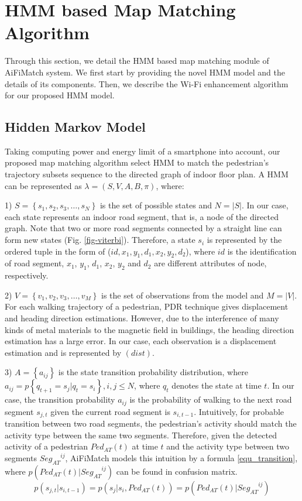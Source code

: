 \documentclass{llncs}
\begin{document}
\section{HMM based Map Matching Algorithm}

Through this section, we detail the HMM based map matching module of AiFiMatch system. We first start by providing the novel HMM model and the details of its components. Then, we describe the Wi-Fi enhancement algorithm for our proposed HMM model.

\subsection{Hidden Markov Model}

Taking computing power and energy limit of a smartphone into account, our proposed map matching algorithm select HMM to match the pedestrian's trajectory subsets sequence to the directed graph of indoor floor plan. A HMM can be represented as $\lambda  = (S,V,A,B,\pi)$, where:

1) $S = \left\{ {{s_1},{s_2},{s_3}, \ldots ,{s_N}} \right\}$ is the set of possible states and $N = \left| S \right|$. In our case, each state represents an indoor road segment, that is, a node of the directed graph. Note that two or more road segments connected by a straight line can form new states (Fig. \ref{fig-viterbi}). Therefore, a state $s_i$ is represented by the ordered tuple in the form of ($id,x_{1},y_{1},d_{1},x_{2},y_{2},d_{2}$), where $id$ is the identification of road segment, $x_{1}$, $y_{1}$, $d_{1}$, $x_{2}$, $y_{2}$ and $d_{2}$ are different attributes of node, respectively. 

2) $V = \left\{ {{v_1},{v_2},{v_3}, \ldots ,{v_M}} \right\}$ is the set of observations from the model and $M = \left| V \right|$. For each walking trajectory of a pedestrian, PDR technique gives displacement and heading direction estimations. However, due to the interference of many kinds of metal materials to the magnetic field in buildings, the heading direction estimation has a large error. In our case, each observation is a displacement estimation and is represented by $(dist)$.

3) $A = \left\{ {{a_{ij}}} \right\}$ is the state transition probability distribution, where \\ ${a_{ij}} = p\left\{ {{q_{t + 1}} = {s_j}|{q_t} = {s_i}} \right\}, i, j \le N$, where ${q_t}$ denotes the state at time $t$. In our case, the transition probability $a_{ij}$ is the probability of walking to the next road segment $s_{j,t}$ given the current road segment is $s_{i,t-1}$. Intuitively, for probable transition between two road segments, the pedestrian's activity should match the activity type between the same two segments. Therefore, given the detected activity of a pedestrian ${Ped_{AT}}(t)$ at time $t$ and the activity type between two segments ${Seg_{AT}}^{ij}$, AiFiMatch models this intuition by a formula \ref{equ_transition}, where $p({Ped_{AT}}(t)|{Seg_{AT}}^{ij})$ can be found in confusion matrix.
\begin{equation}
\label{equ_transition}
p({s_{j,t}}|{s_{i,t - 1}}) = p({s_j}|{s_i},{Ped_{AT}}(t)) = p({Ped_{AT}}(t)|{Seg_{AT}}^{ij})
\end{equation}
\end{document}
